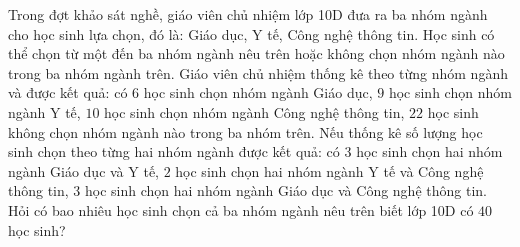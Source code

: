 \begin{ex}%
Trong đợt khảo sát nghề, giáo viên chủ nhiệm lớp 10D đưa ra ba nhóm ngành cho học sinh lựa chọn, đó là: Giáo dục, Y tế, Công nghệ thông tin. Học sinh có thể chọn từ một đến ba nhóm ngành nêu trên hoặc không chọn nhóm ngành nào trong ba nhóm ngành trên. Giáo viên chủ nhiệm thống kê theo từng nhóm ngành và được kết quả: có $6$ học sinh chọn nhóm ngành Giáo dục, $9$ học sinh chọn nhóm ngành Y tế, $10$ học sinh chọn nhóm ngành Công nghệ thông tin, $22$ học sinh không chọn nhóm ngành nào trong ba nhóm trên. Nếu thống kê số lượng học sinh chọn theo từng hai nhóm ngành được kết quả: có $3$ học sinh chọn hai nhóm ngành Giáo dục và Y tế, $2$ học sinh chọn hai nhóm ngành Y tế và Công nghệ thông tin, $3$ học sinh chọn hai nhóm ngành Giáo dục và Công nghệ thông tin. Hỏi có bao nhiêu học sinh chọn cả ba nhóm ngành nêu trên biết lớp 10D có $40$ học sinh?
\par{}
\end{ex}
